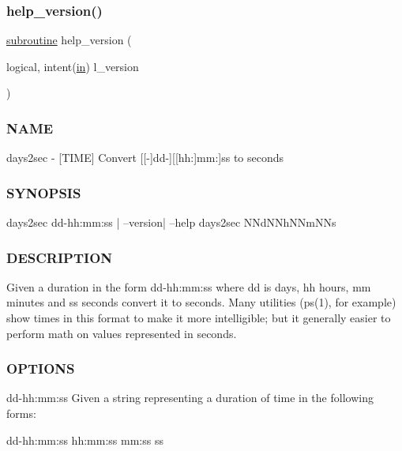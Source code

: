 \subsubsection{\texorpdfstring{help\+\_\+version()}{help\_version()}}
{\footnotesize\ttfamily \hyperlink{M__stopwatch_83_8txt_acfbcff50169d691ff02d4a123ed70482}{subroutine} help\+\_\+version (\begin{DoxyParamCaption}\item[{logical, intent(\hyperlink{M__journal_83_8txt_afce72651d1eed785a2132bee863b2f38}{in})}]{l\+\_\+version }\end{DoxyParamCaption})}



\subsubsection*{N\+A\+ME}

days2sec -\/ \mbox{[}T\+I\+ME\mbox{]} Convert \mbox{[}\mbox{[}-\/\mbox{]}dd-\/\mbox{]}\mbox{[}\mbox{[}hh\+:\mbox{]}mm\+:\mbox{]}ss to seconds 

\subsubsection*{S\+Y\+N\+O\+P\+S\+IS}

\begin{DoxyVerb}days2sec dd-hh:mm:ss | --version| --help
days2sec NNdNNhNNmNNs
\end{DoxyVerb}


\subsubsection*{D\+E\+S\+C\+R\+I\+P\+T\+I\+ON}

Given a duration in the form dd-\/hh\+:mm\+:ss where dd is days, hh hours, mm minutes and ss seconds convert it to seconds. Many utilities (ps(1), for example) show times in this format to make it more intelligible; but it generally easier to perform math on values represented in seconds.

\subsubsection*{O\+P\+T\+I\+O\+NS}

dd-\/hh\+:mm\+:ss Given a string representing a duration of time in the following forms\+:

dd-\/hh\+:mm\+:ss hh\+:mm\+:ss mm\+:ss ss

